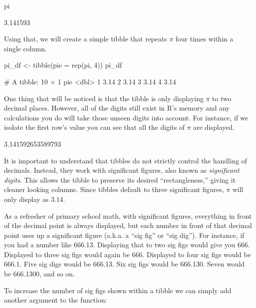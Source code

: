\begin{inR}
pi
\end{inR}
\begin{outR}
[1] 3.141593
\end{outR}

\noindent
Using that, we will create a simple tibble that repeats $\pi$ four times within a single column.

\begin{inR}
pi_df <- tibble(pie = rep(pi, 4))
pi_df
\end{inR}
\begin{outR}
# A tibble: 10 × 1
     pie
   <dbl>
 1  3.14
 2  3.14
 3  3.14
 4  3.14
\end{outR}

\noindent
One thing that will be noticed is that the tibble is only displaying $\pi$ to two decimal places. However, all of the digits still exist in R's memory and any calculations you do will take those unseen digits into account. For instance, if we isolate the first row's value you can see that all the digits of $\pi$ are displayed.

\begin{outR}
[1] 3.141592653589793
\end{outR}

\noindent
It is important to understand that tibbles do not strictly control the handling of decimals. Instead, they work with \gls{significant figures}, also known as \textit{significant digits}.  This allows the tibble to preserve its desired ``rectangleness,'' giving it cleaner looking columns. Since tibbles default to three significant figures, $\pi$ will only display as 3.14. 

As a refresher of primary school math, with significant figures, everything in front of the decimal point is always displayed, but each number in front of that decimal point uses up a significant figure (a.k.a. a ``sig fig'' or ``sig dig''). For instance, if you had a number like 666.13.  Displaying that to two sig figs would give you 666.  Displayed to three sig figs would again be 666. Displayed to four sig figs would be 666.1. Five sig digs would be 666.13. Six sig figs would be 666.130. Seven would be 666.1300, and so on.

To increase the number of sig figs shown within a tibble we can simply add another argument to the  function:

